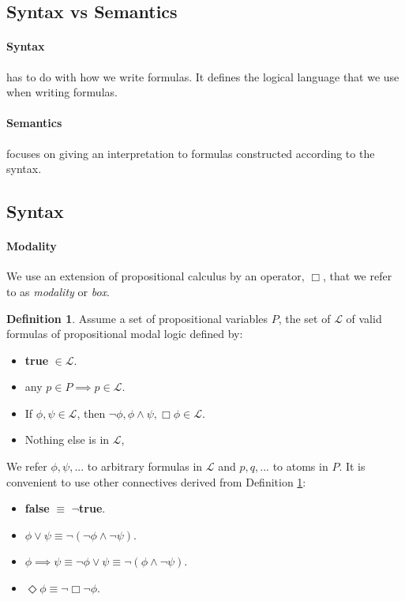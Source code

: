 \documentclass{article}
\theoremstyle{plain}
\theoremstyle{definition}
\newtheorem{defn}[thm]{Definition} %
\begin{document}
\begin{multicols}{2}
\subsection{Syntax vs Semantics}

\paragraph{Syntax} has to do with how we write formulas. It defines the logical language that we use when writing formulas.

\paragraph{Semantics} focuses on giving an interpretation to formulas constructed according to the syntax.

\subsection{Syntax}

\paragraph{Modality} We use an extension of propositional calculus by an operator, $\Box$, that we refer to as \textit{modality} or \textit{box}.

\begin{defn}\label{defn:Syntax} Assume a set of propositional variables $P$, the set of $\mathcal{L}$ of valid formulas of propositional modal logic defined by: \end{defn}

\begin{itemize}
\item \textbf{true} $\in \mathcal{L}$.
\item any $p \in P \implies p \in \mathcal{L}$.
\item If $\phi, \psi \in \mathcal{L}$, then $\lnot \phi, \phi \land \psi, \Box \phi \in \mathcal{L}$.
\item Nothing else is in $\mathcal{L}$,
\end{itemize}

We refer $\phi, \psi,...$ to arbitrary formulas in $\mathcal{L}$ and $p, q, ...$ to atoms in $P$. It is convenient to use other connectives derived from Definition \ref{defn:Syntax}:

\begin{itemize}
\item \textbf{false} $\equiv$ $\lnot$\textbf{true}.
\item $\phi \lor \psi \equiv \lnot(\lnot\phi \land \lnot\psi)$.
\item $\phi \implies \psi \equiv \lnot\phi\lor\psi \equiv \lnot(\phi \land \lnot\psi)$.
\item $\Diamond\phi \equiv \lnot\Box\lnot\phi$.
\end{itemize}


\end{multicols}
\end{document}
